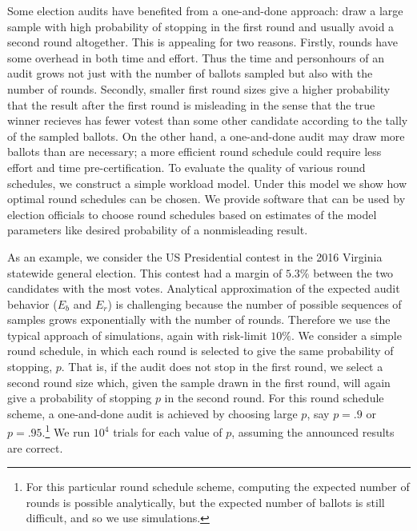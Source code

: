 
Some election audits have benefited from a one-and-done approach: draw a large sample with high probability of stopping in the first round and usually avoid a second round altogether. This is appealing for two reasons. Firstly, rounds have some overhead in both time and effort. Thus the time and personhours of an audit grows not just with the number of ballots sampled but also with the number of rounds. Secondly, smaller first round sizes give a higher probability that the result after the first round is misleading in the sense that the true winner recieves has fewer votest than some other candidate according to the tally of the sampled ballots. On the other hand, a one-and-done audit may draw more ballots than are necessary; a more efficient round schedule could require less effort and time pre-certification. To evaluate the quality of various round schedules, we construct a simple workload model. Under this model we show how optimal round schedules can be chosen. We provide software that can be used by election officials to choose round schedules based on estimates of the model parameters like desired probability of a nonmisleading result.

As an example, we consider the US Presidential contest in the 2016 Virginia statewide general election. This contest had a margin of $5.3\%$ between the two candidates with the most votes.
Analytical approximation of the expected audit behavior ($E_b$ and $E_r$) is challenging because the number of possible sequences of samples grows exponentially with the number of rounds. 
Therefore we use the typical approach of simulations, again with risk-limit $10\%$.
We consider a simple round schedule, in which each round is selected to give the same probability of stopping, $p$. That is, if the audit does not stop in the first round, we select a second round size which, given the sample drawn in the first round, will again give a probability of stopping $p$ in the second round. For this round schedule scheme, a one-and-done audit is achieved by choosing large $p$, say $p=.9$ or $p=.95$.\footnote{For this particular round schedule scheme, computing the expected number of rounds is possible analytically, but the expected number of ballots is still difficult, and so we use simulations.} We run $10^4$ trials for each value of $p$, assuming the announced results are correct. 

